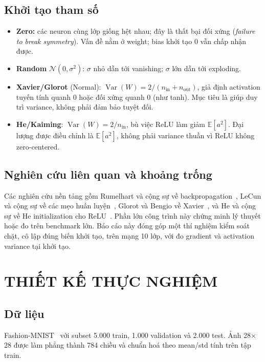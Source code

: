 \documentclass[12pt,a4paper]{report}
\begin{document}
\section{Khởi tạo tham số}
\begin{itemize}
  \item \textbf{Zero:} các neuron cùng lớp giống hệt nhau; đây là thất bại đối xứng (\emph{failure to break symmetry}). Vấn đề nằm ở weight; bias khởi tạo 0 vẫn chấp nhận được.
  \item \textbf{Random} $\mathcal N(0,\sigma^2)$: $\sigma$ nhỏ dẫn tới vanishing; $\sigma$ lớn dẫn tới exploding.
  \item \textbf{Xavier/Glorot} (Normal): $\operatorname{Var}(W)=2/(n_{\text{in}}+n_{\text{out}})$, giả định activation tuyến tính quanh 0 hoặc đối xứng quanh 0 (như tanh). Mục tiêu là giúp duy trì variance, không phải đảm bảo tuyệt đối.
  \item \textbf{He/Kaiming}: $\operatorname{Var}(W)=2/n_{\text{in}}$, bù việc ReLU làm giảm $\mathbb E[a^2]$. Đại lượng được điều chỉnh là $\mathbb E[a^2]$, không phải variance thuần vì ReLU không zero-centered.
\end{itemize}

\section{Nghiên cứu liên quan và khoảng trống}
Các nghiên cứu nền tảng gồm Rumelhart và cộng sự về backpropagation~\cite{rumelhart}, LeCun và cộng sự về các mẹo huấn luyện~\cite{lecun}, Glorot và Bengio về Xavier~\cite{glorot}, và He và cộng sự về He initialization cho ReLU~\cite{he}. Phần lớn công trình này chứng minh lý thuyết hoặc đo trên benchmark lớn. Báo cáo này đóng góp một thí nghiệm kiểm soát chặt, cô lập đúng biến khởi tạo, trên mạng 10 lớp, với đo gradient và activation variance tại khởi tạo.

\chapter{THIẾT KẾ THỰC NGHIỆM}

\section{Dữ liệu}
Fashion-MNIST~\cite{fmnist} với subset 5.000 train, 1.000 validation và 2.000 test. Ảnh 28$\times$28 được làm phẳng thành 784 chiều và chuẩn hoá theo mean/std tính trên tập train.
\end{document}
